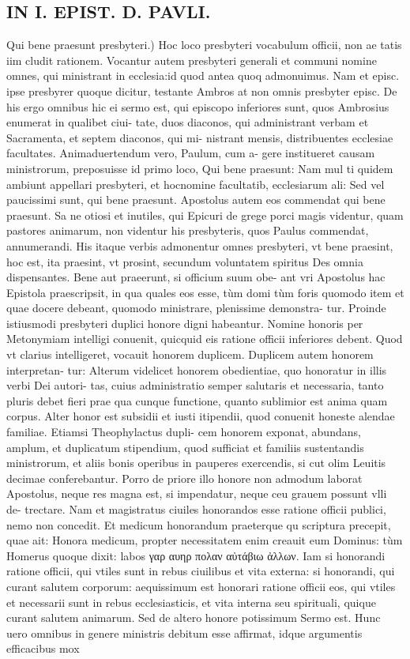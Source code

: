 \documentclass{article}
\begin{document}
\begin{pages}
\section*{IN I. EPIST. D. PAVLI. }
\marginpar{[ p.112 ]}\pstart Qui bene praesunt presbyteri.) Hoc loco presbyteri vocabulum officii, non ae tatis iim cludit rationem. Vocantur autem presbyteri generali et communi nomine omnes, qui ministrant in ecclesia:id quod antea quoq admonuimus. Nam et episc. ipse presbyrer quoque dicitur, testante Ambros at non omnis presbyter episc. De his ergo omnibus hic ei sermo est, qui episcopo inferiores sunt, quos Ambrosius enumerat in qualibet ciui- tate, duos diaconos, qui administrant verbam et Sacramenta, et septem diaconos, qui mi- nistrant mensis, distribuentes ecclesiae facultates. Animaduertendum vero, Paulum, cum a- gere institueret causam ministrorum, preposuisse id primo loco, Qui bene praesunt: Nam mul ti quidem ambiunt appellari presbyteri, et hocnomine facultatib, ecclesiarum ali: Sed vel paucissimi sunt, qui bene praesunt. Apostolus autem eos commendat qui bene praesunt. Sa ne otiosi et inutiles, qui Epicuri de grege porci magis videntur, quam pastores animarum, non videntur his presbyteris, quos Paulus commendat, annumerandi. His itaque verbis admonentur omnes presbyteri, vt bene praesint, hoc est, ita praesint, vt prosint, secundum voluntatem spiritus Des omnia dispensantes. Bene aut praeerunt, si officium suum obe- ant vri Apostolus hac Epistola praescripsit, in qua quales eos esse, tùm domi tùm foris quomodo item et quae docere debeant, quomodo ministrare, plenissime demonstra- tur. Proinde istiusmodi presbyteri duplici honore digni habeantur. Nomine honoris per Metonymiam intelligi conuenit, quicquid eis ratione officii inferiores debent. Quod vt clarius intelligeret, vocauit honorem duplicem. Duplicem autem honorem interpretan- tur: Alterum videlicet honorem obedientiae, quo honoratur in illis verbi Dei autori- tas, cuius administratio semper salutaris et necessaria, tanto pluris debet fieri prae qua cunque functione, quanto sublimior est anima quam corpus. Alter honor est subsidii et iusti itipendii, quod conuenit honeste alendae familiae. Etiamsi Theophylactus dupli- cem honorem exponat, abundans, amplum, et duplicatum stipendium, quod sufficiat et familiis sustentandis ministrorum, et aliis bonis operibus in pauperes exercendis, si cut olim Leuitis decimae conferebantur. Porro de priore illo honore non admodum laborat Apostolus, neque res magna est, si impendatur, neque ceu grauem possunt vlli de- trectare. Nam et magistratus ciuiles honorandos esse ratione officii publici, nemo non concedit. Et medicum honorandum praeterque qu scriptura precepit, quae ait: Honora medicum, propter necessitatem enim creauit eum Dominus: tùm Homerus quoque dixit: labos γαρ αυηρ πολαν αὐτάβιω ἀλλων. Iam si honorandi ratione officii, qui vtiles sunt in rebus ciuilibus et vita externa: si honorandi, qui curant salutem corporum: aequissimum est honorari ratione officii eos, qui vtiles et necessarii sunt in rebus ecclesiasticis, et vita interna seu spirituali, quique curant salutem animarum. Sed de altero honore potissimum Sermo est. Hunc uero omnibus in genere ministris debitum esse affirmat, idque argumentis efficacibus mox 
\end{pages}
\end{document}

